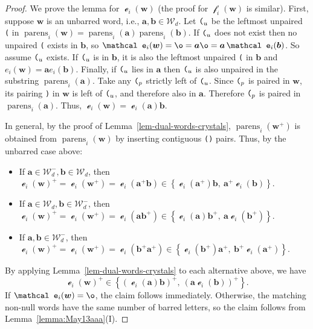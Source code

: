 \documentclass[12pt]{amsart}
\newcommand{\bs}{\boldsymbol}
\DeclareMathOperator{\worde}{{\mathcal e}}
\DeclareMathOperator{\wordf}{{\mathcal f}}
\theoremstyle{definition}
\theoremstyle{remark}
\begin{document}
\begin{proof}
We prove the lemma for $\worde_i({\bs w})$ (the proof for $\wordf_i({\bs w})$ is similar).
First, suppose $\bs{w}$ is an unbarred word, i.e., ${\bs a}, {\bs b}\in {\mathcal W}_{d}$. Let $\text{{\tt (}}_u$
be the leftmost unpaired {\tt (} in $\operatorname{parens}_i({\bs w})=\operatorname{parens}_i({\bs a})\operatorname{parens}_i({\bs b})$.
 If $\text{{\tt (}}_u$ does not exist then no unpaired {\tt (} exists in ${\bs b}$, so $\worde_i({\bs w}) = \o = {\bs a}\o={\bs a}\worde_i({\bs b})$. So assume $\text{{\tt (}}_u$ exists.
If $\text{{\tt (}}_u$ is in ${\bs b}$, it is also the leftmost unpaired {\tt (} in ${\bs b}$ and 
$e_i({\bs w}) = {\bs a}e_i({\bs b})$.
Finally, if $\text{{\tt (}}_u$ lies in ${\bs a}$ then $\text{{\tt (}}_u$ is also unpaired in the substring $\operatorname{parens}_i({\bs a})$. 
Take any $\text{{\tt (}}_p$ strictly left of $\text{{\tt (}}_u$. Since $\text{{\tt (}}_p$ is
paired in ${\bs w}$, its pairing {\tt )} in ${\bs w}$ is left of $\text{{\tt (}}_u$, and therefore also in ${\bs a}$. Therefore $\text{{\tt (}}_p$ is paired in $\operatorname{parens}_i({\bs a})$. Thus, $\worde_i({\bs w}) = \worde_i({\bs a}){\bs b}$.

In general, by the proof of Lemma~\ref{lem-dual-words-crystals},
$\operatorname{parens}_i({\bs w}^+)$ is obtained from
$\operatorname{parens}_i({\bs w})$ by inserting contiguous {\tt ()} pairs.
Thus, by the unbarred case above:
\begin{itemize}
\item If $\bs{a}\in {\mathcal W}_{d}^-, \bs{b}\in  {\mathcal W}_{d}$, then 
$
\worde_i({\bs w})^+ = \worde_i({\bs w}^+) =  \worde_i({\bs a}^+ {\bs b}) \in 
\left\{\worde_i({\bs a}^+){\bs b},\ {\bs a}^+\worde_i({\bs b})\right\}.$
\item If $\bs{a}\in {\mathcal W}_{d}, \bs{b}\in {\mathcal W}_{d}^-$, then 
$\worde_i({\bs w})^+ = \worde_i({\bs w}^+) = \worde_i({\bs a}{\bs b}^+) \in 
\left\{\worde_i({\bs a}){\bs b}^+, \ {\bs a}\worde_i({\bs b}^+)\right\}$.
\item If $\bs{a},\bs{b}\in {\mathcal W}_{d}^-$, then
$\worde_i({\bs w})^+ = \worde_i({\bs w}^+) = \worde_i({\bs b}^+{\bs a}^+) \in 
\left\{\worde_i({\bs b}^+){\bs a}^+, \ {\bs b}^+\worde_i({\bs a}^+)\right\}$.
\end{itemize}
By applying Lemma~\ref{lem-dual-words-crystals} to each alternative above, we 
have
\[\worde_i({\bs w})^+\in\left\{(\worde_i({\bs a}){\bs b})^+, \ ({\bs a}\worde_i({\bs b}))^+\right\}.\]
If $\worde_i({\bs w})=\o$, the claim follows immediately. Otherwise, the
matching non-null words have the same number of barred letters, so the claim
follows from Lemma~\ref{lemma:May13aaa}(I).
\end{proof}
\end{document}
